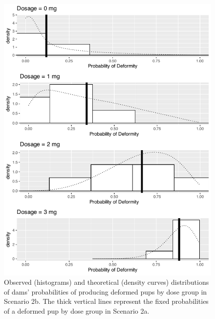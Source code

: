 \documentclass[
]{krantz}
\begin{document}
\begin{figure}

{\centering \includegraphics[width=0.6\linewidth]{bookdown-BeyondMLR_files/figure-latex/scenario2bPlot-1} 

}

\caption{Observed (histograms) and theoretical (density curves) distributions of dams' probabilities of producing deformed pups by dose group in Scenario 2b.  The thick vertical lines represent the fixed probabilities of a deformed pup by dose group in Scenario 2a.}\label{fig:scenario2bPlot}
\end{figure}

\begin{table}

\caption{\label{tab:scenario2Tab}Summary statistics of Scenario 2 by dose.}
\centering
{}
\end{table}
\end{document}

